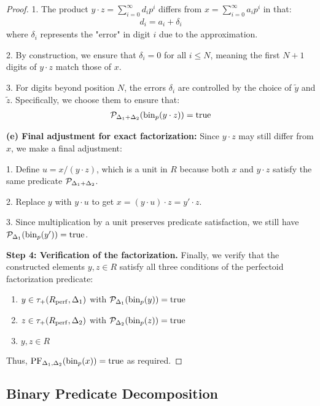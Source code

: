 \begin{proof}
1. The product $y \cdot z = \sum_{i=0}^{\infty} d_i p^i$ differs from $x = \sum_{i=0}^{\infty} a_i p^i$ in that:
\begin{align*}
d_i = a_i + \delta_i
\end{align*}
where $\delta_i$ represents the "error" in digit $i$ due to the approximation.

2. By construction, we ensure that $\delta_i = 0$ for all $i \leq N$, meaning the first $N+1$ digits of $y \cdot z$ match those of $x$.

3. For digits beyond position $N$, the errors $\delta_i$ are controlled by the choice of $\tilde{y}$ and $\tilde{z}$. Specifically, we choose them to ensure that:
\begin{align*}
\mathcal{P}_{\Delta_1+\Delta_2}(\operatorname{bin}_p(y \cdot z)) = \text{true}
\end{align*}

\textbf{(e) Final adjustment for exact factorization:} Since $y \cdot z$ may still differ from $x$, we make a final adjustment:

1. Define $u = x/(y \cdot z)$, which is a unit in $R$ because both $x$ and $y \cdot z$ satisfy the same predicate $\mathcal{P}_{\Delta_1+\Delta_2}$.

2. Replace $y$ with $y \cdot u$ to get $x = (y \cdot u) \cdot z = y' \cdot z$.

3. Since multiplication by a unit preserves predicate satisfaction, we still have $\mathcal{P}_{\Delta_1}(\operatorname{bin}_p(y')) = \text{true}$.

\textbf{Step 4: Verification of the factorization.}
Finally, we verify that the constructed elements $y, z \in R$ satisfy all three conditions of the perfectoid factorization predicate:
\begin{enumerate}
    \item $y \in \tau_+(R_{\operatorname{perf}},\Delta_1)$ with $\mathcal{P}_{\Delta_1}(\operatorname{bin}_p(y)) = \text{true}$
    \item $z \in \tau_+(R_{\operatorname{perf}},\Delta_2)$ with $\mathcal{P}_{\Delta_2}(\operatorname{bin}_p(z)) = \text{true}$
    \item $y, z \in R$
\end{enumerate}

Thus, $\text{PF}_{\Delta_1, \Delta_2}(\operatorname{bin}_p(x)) = \text{true}$ as required.
\end{proof}

\subsection{Binary Predicate Decomposition}

